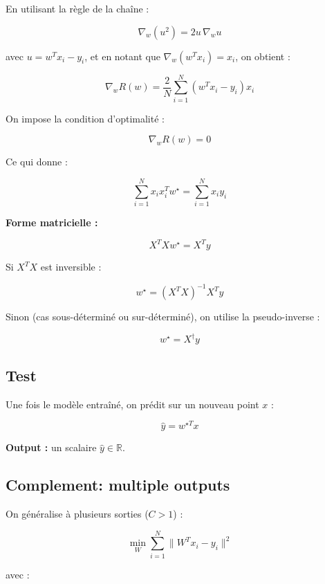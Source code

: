\documentclass[11pt,a4paper,openany]{book}
\begin{document}
\vspace{0.4cm}

En utilisant la règle de la chaîne :

\[
\nabla_w (u^2) = 2u \, \nabla_w u
\]

avec \( u = w^T x_i - y_i \), et en notant que \( \nabla_w (w^T x_i) = x_i \), on obtient :

\[
\nabla_w R(w)
=
\frac{2}{N} \sum_{i=1}^{N} (w^T x_i - y_i)x_i
\]

On impose la condition d'optimalité :

\[
\nabla_w R(w) = 0
\]

Ce qui donne :

\[
\sum_{i=1}^{N} x_i x_i^T w^\star = \sum_{i=1}^{N} x_i y_i
\]

\vspace{0.4cm}

\textbf{Forme matricielle :}

\[
X^T X w^\star = X^T y
\]

\vspace{0.4cm}

Si $X^T X$ est inversible :

\[
w^\star = (X^T X)^{-1} X^T y
\]

Sinon (cas sous-déterminé ou sur-déterminé), on utilise la pseudo-inverse :

\[
w^\star = X^\dagger y
\]

\vspace{0.8cm}

\subsection{Test}

Une fois le modèle entraîné, on prédit sur un nouveau point $x$ :

\[
\hat{y} = w^{\star T} x
\]

\textbf{Output :} un scalaire $\hat{y} \in \mathbb{R}$.

\vspace{0.8cm}

\subsection{Complement: multiple outputs}

On généralise à plusieurs sorties ($C > 1$) :

\[
\min_W \sum_{i=1}^{N} \|W^T x_i - y_i\|^2
\]

avec :
\end{document}
